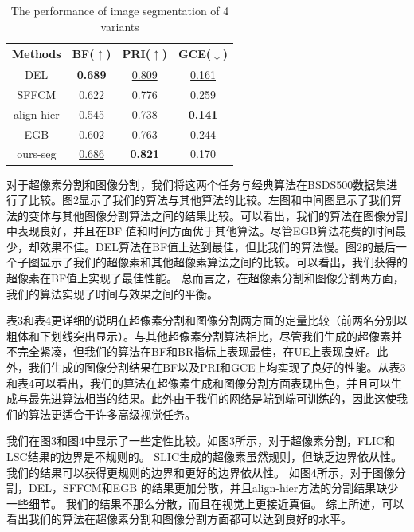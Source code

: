 \begin{table}[htbp]
\caption{The performance of image segmentation of 4 variants}\label{tab:table4}
\vspace{0.5em}\centering\wuhao
\begin{tabular}{cccc}
\toprule[1.5pt]
Methods & BF($\uparrow$) & PRI($\uparrow$) & GCE($\downarrow$) \\
\midrule[1pt]
DEL        & \textbf{0.689}    & \underline{0.809}  & \underline{0.161}\\
SFFCM      & 0.622             & 0.776              & 0.259\\
align-hier & 0.545             & 0.738              & \textbf{0.141} \\
EGB        & 0.602             & 0.763              & 0.244\\
ours-seg   & \underline{0.686} & \textbf{0.821}     & 0.170 \\
\bottomrule[1.5pt]
\end{tabular}
\vspace{\baselineskip}
\end{table}

对于超像素分割和图像分割，我们将这两个任务与经典算法在BSDS500数据集进行了比较。图2显示了我们的算法与其他算法的比较。左图和中间图显示了我们算法的变体与其他图像分割算法之间的结果比较。可以看出，我们的算法在图像分割中表现良好，并且在BF 值和时间方面优于其他算法。尽管EGB算法花费的时间最少，却效果不佳。DEL算法在BF值上达到最佳，但比我们的算法慢。图2的最后一个子图显示了我们的超像素和其他超像素算法之间的比较。可以看出，我们获得的超像素在BF值上实现了最佳性能。 总而言之，在超像素分割和图像分割两方面，我们的算法实现了时间与效果之间的平衡。

表3和表4更详细的说明在超像素分割和图像分割两方面的定量比较（前两名分别以粗体和下划线突出显示）。与其他超像素分割算法相比，尽管我们生成的超像素并不完全紧凑，但我们的算法在BF和BR指标上表现最佳，在UE上表现良好。此外，我们生成的图像分割结果在BF以及PRI和GCE上均实现了良好的性能。从表3和表4可以看出，我们的算法在超像素生成和图像分割方面表现出色，并且可以生成与最先进算法相当的结果。此外由于我们的网络是端到端可训练的，因此这使我们的算法更适合于许多高级视觉任务。

我们在图3和图4中显示了一些定性比较。如图3所示，对于超像素分割，FLIC和LSC结果的边界是不规则的。 SLIC生成的超像素虽然规则，但缺乏边界依从性。 我们的结果可以获得更规则的边界和更好的边界依从性。 如图4所示，对于图像分割，DEL，SFFCM和EGB 的结果更加分散，并且align-hier方法的分割结果缺少一些细节。 我们的结果不那么分散，而且在视觉上更接近真值。 综上所述，可以看出我们的算法在超像素分割和图像分割方面都可以达到良好的水平。
